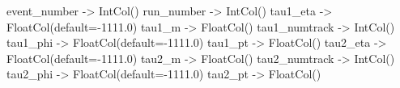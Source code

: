 \begin{footnotesize}
\begin{pyglist}[language=text,texcl=true,abovecaptionskip=0,style=bw]
event_number -> IntCol()
run_number -> IntCol()
tau1_eta -> FloatCol(default=-1111.0)
tau1_m -> FloatCol()
tau1_numtrack -> IntCol()
tau1_phi -> FloatCol(default=-1111.0)
tau1_pt -> FloatCol()
tau2_eta -> FloatCol(default=-1111.0)
tau2_m -> FloatCol()
tau2_numtrack -> IntCol()
tau2_phi -> FloatCol(default=-1111.0)
tau2_pt -> FloatCol()
\end{pyglist}
\end{footnotesize}

